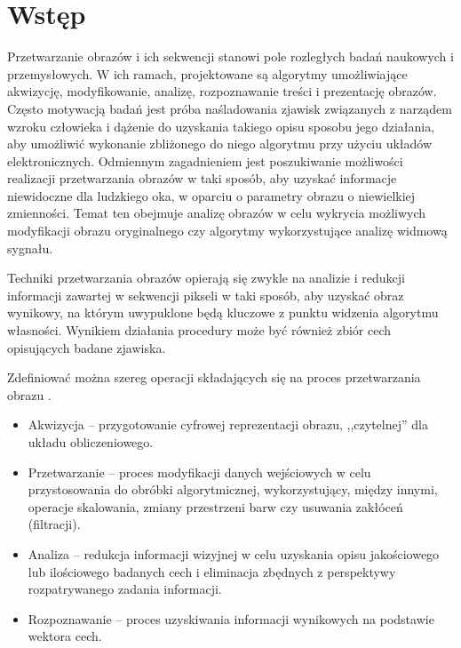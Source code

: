 \chapter{Wstęp}
\label{cha:intruduction}


Przetwarzanie obrazów i ich sekwencji stanowi pole rozległych badań naukowych i przemysłowych.
W ich ramach, projektowane są algorytmy umożliwiające akwizycję, modyfikowanie, analizę, rozpoznawanie treści i prezentację obrazów.
Często motywacją badań jest próba naśladowania zjawisk związanych z narządem wzroku człowieka i dążenie do uzyskania takiego opisu sposobu jego działania, aby umożliwić wykonanie zbliżonego do niego algorytmu przy użyciu układów elektronicznych. 
Odmiennym zagadnieniem jest poszukiwanie możliwości realizacji przetwarzania obrazów w taki sposób, aby uzyskać informacje niewidoczne dla ludzkiego oka, w oparciu o parametry obrazu o niewielkiej zmienności. Temat ten obejmuje analizę obrazów w celu wykrycia możliwych modyfikacji obrazu oryginalnego czy algorytmy wykorzystujące analizę widmową sygnału. 

Techniki przetwarzania obrazów opierają się zwykle na analizie i redukcji informacji zawartej w sekwencji pikseli w taki sposób, aby uzyskać obraz wynikowy, na którym uwypuklone będą kluczowe z punktu widzenia algorytmu własności.
Wynikiem działania procedury może być również zbiór cech opisujących badane zjawiska.

Zdefiniować można szereg operacji składających się na proces przetwarzania obrazu \cite{Tadeusiewicz1997}.
\begin{itemize}
	\item Akwizycja -- przygotowanie cyfrowej reprezentacji obrazu, ,,czytelnej'' dla układu obliczeniowego.
	
	\item Przetwarzanie -- proces modyfikacji danych wejściowych w celu przystosowania do obróbki algorytmicznej, wykorzystujący, między innymi, operacje skalowania, zmiany przestrzeni barw czy usuwania zakłóceń (filtracji).
	
	\item Analiza -- redukcja informacji wizyjnej w celu uzyskania opisu jakościowego lub ilościowego badanych cech i eliminacja zbędnych z perspektywy rozpatrywanego zadania informacji.
	
	\item Rozpoznawanie -- proces uzyskiwania informacji wynikowych na podstawie wektora cech.
\end{itemize}

